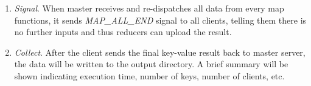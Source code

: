 \begin{enumerate}
\item \emph{Signal}. When master receives and re-dispatches all data from every map functions, it sends \emph{MAP\_ALL\_END} signal to all clients, telling them there is no further inputs and thus reducers can upload the result.

\item \emph{Collect}. After the client sends the final key-value result back to master server, the data will be written to the output directory. A brief summary will be shown indicating execution time, number of keys, number of clients, etc.

\end{enumerate}
